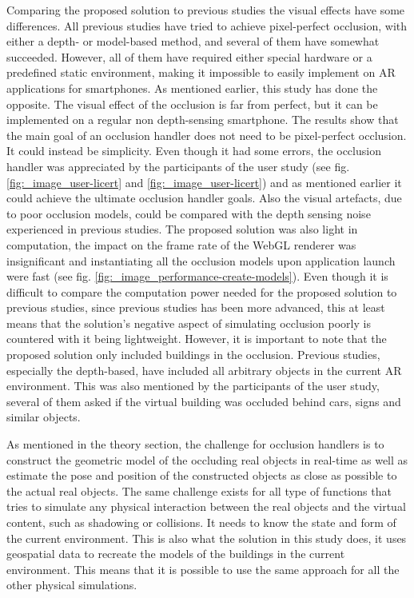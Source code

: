 Comparing the proposed solution to previous studies the visual effects have some differences. All previous studies have tried to achieve pixel-perfect occlusion, with either a depth- or model-based method, and several of them have somewhat succeeded. However, all of them have required either special hardware or a predefined static environment, making it impossible to easily implement on AR applications for smartphones. As mentioned earlier, this study has done the opposite. The visual effect of the occlusion is far from perfect, but it can be implemented on a regular non depth-sensing smartphone. The results show that the main goal of an occlusion handler does not need to be pixel-perfect occlusion. It could instead be simplicity. Even though it had some errors, the occlusion handler was appreciated by the participants of the user study (see fig. \ref{fig:_image_user-licert} and \ref{fig:_image_user-licert}) and as mentioned earlier it could achieve the ultimate occlusion handler goals. Also the visual artefacts, due to poor occlusion models, could be compared with the depth sensing noise experienced in previous studies. The proposed solution was also light in computation, the impact on the frame rate of the WebGL renderer was insignificant and instantiating all the occlusion models upon application launch were fast (see fig. \ref{fig:_image_performance-create-models}). Even though it is difficult to compare the computation power needed for the proposed solution to previous studies, since previous studies has been more advanced, this at least means that the solution's negative aspect of simulating occlusion poorly is countered with it being lightweight. However, it is important to note that the proposed solution only included buildings in the occlusion. Previous studies, especially the depth-based, have included all arbitrary objects in the current AR environment. This was also mentioned by the participants of the user study, several of them asked if the virtual building was occluded behind cars, signs and similar objects.

As mentioned in the theory section, the challenge for occlusion handlers is to  construct the geometric model of the occluding real objects in real-time as well as estimate the pose and position of the constructed objects as close as possible to the actual real objects. The same challenge exists for all type of functions that tries to simulate any physical interaction between the real objects and the virtual content, such as shadowing or collisions. It needs to know the state and form of the current environment. This is also what the solution in this study does, it uses geospatial data to recreate the models of the buildings in the current environment. This means that it is possible to use the same approach for all the other physical simulations.

